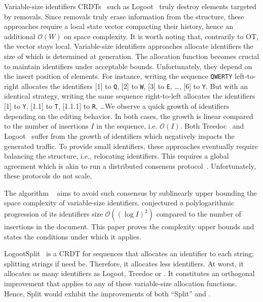 Variable-size identifiers CRDTs~\cite{nedelec2013lseq, preguica2009commutative,
  weiss2009logoot} such as Logoot~\cite{weiss2009logoot} truly destroy elements
targeted by removals.  Since removals truly erase information from the
structure, these approaches require a local state vector compacting their
history, hence an additional $\mathcal{O}(W)$ on space complexity. It is worth
noting that, contrarily to OT, the vector stays local. Variable-size identifiers
approaches allocate identifiers the size of which is determined at
generation. The allocation function becomes crucial to maintain identifiers
under acceptable bounds. Unfortunately, they depend on the insert position of
elements. For instance, writing the sequence \texttt{QWERTY} left-to-right
allocates the identifiers [1] to \texttt{Q}, [2] to \texttt{W}, [3] to
\texttt{E}, \ldots, [6] to \texttt{Y}. But with an identical strategy, writing
the same sequence right-to-left allocates the identifiers [1] to \texttt{Y},
[1.1] to \texttt{T}, [1.1.1] to \texttt{R}, \ldots We observe a quick growth of
identifiers depending on the editing behavior. In both cases, the growth is
linear compared to the number of insertions $I$ in the sequence,
i.e. $\mathcal{O}(I)$. Both Treedoc~\cite{preguica2009commutative} and
Logoot~\cite{weiss2009logoot, weiss2010logootundo} suffer from the growth of
identifiers which negatively impacts the generated traffic.
To provide small identifiers, these approaches eventually require balancing the
structure, i.e., relocating identifiers. This requires a global agreement which is
akin to run a distributed consensus
protocol~\cite{zawirski2011asynchronous}. Unfortunately, these protocols do not
scale.

\noindent The algorithm \LSEQ~\cite{nedelec2013lseq} aims to avoid such
consensus by sublinearly upper bounding the space complexity of variable-size
identifiers. \cite{nedelec2013lseq} conjectured a polylogarithmic progression of
its identifiers size $\mathcal{O}((\log I)^2)$ compared to the number of
insertions in the document. This paper proves the complexity upper bounds and
states the conditions under which it applies.

LogootSplit~\cite{andre2013supporting} is a CRDT for sequences that allocates an
identifier to each string; splitting strings if need be. Therefore, it allocates
less identifiers. At worst, it allocates as many identifiers as Logoot, Treedoc
or \LSEQ. It constitutes an orthogonal improvement that applies to any of these
variable-size allocation functions. Hence, \LSEQ{}Split would exhibit the
improvements of both ``Split'' and \LSEQ.


